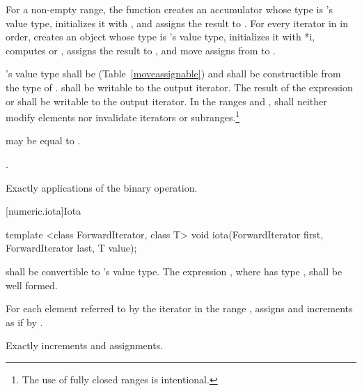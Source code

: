 \begin{itemdescr}
\pnum
\effects For a non-empty range,
the function creates an accumulator  whose type is 's
value type, initializes it with ,
and assigns the result to . For every iterator  in 
in order, creates an object  whose type is 's value type, initializes it
with *i, computes  or , assigns the result
to , and move assigns from  to .

\pnum
\requires
{}'s value type shall be  (Table~\ref{moveassignable})
and shall be constructible from the type of .  shall be
writable to the  output iterator. The result of the expression 
or  shall be writable to the  output iterator.
In the ranges
and
,
shall neither modify elements nor invalidate iterators or
subranges.\footnote{The use of fully closed ranges is intentional.}

\pnum
\notes
{}
may be equal to
.

\pnum
\returns
{}.

\pnum
\complexity
Exactly
applications of
the binary operation.
\end{itemdescr}

[numeric.iota]{Iota}

%
\begin{itemdecl}
template <class ForwardIterator, class T>
  void iota(ForwardIterator first, ForwardIterator last, T value);
\end{itemdecl}

\begin{itemdescr}
\pnum
\requires {} shall be convertible to 's value
type. The expression , where  has type , shall
be well formed.

\pnum
\effects For each element referred to by the iterator  in the range
, assigns  and increments  as
if by .

\pnum
\complexity Exactly  increments and assignments.
\end{itemdescr}


